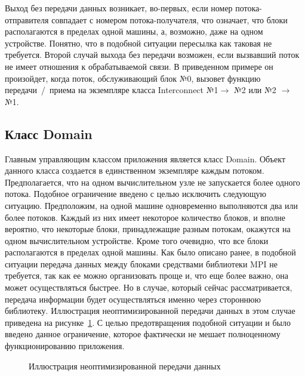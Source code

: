 \documentclass[a4paper, 14pt]{extarticle}
\theoremstyle{definition}
\begin{document}
\par Выход без передачи данных возникает, во-первых, если номер потока-отправителя совпадает с номером потока-получателя, что означает, что блоки располагаются в пределах одной машины, а, возможно, даже на одном устройстве. Понятно, что в подобной ситуации пересылка как таковая не требуется. Второй случай выхода без передачи возможен, если вызвавший поток не имеет отношения к обрабатываемой связи. В приведенном примере он произойдет, когда поток, обслуживающий блок №0, вызовет функцию передачи~/~приема на экземпляре класса Interconnect {№1$\to$ №2} или {№2 $\to$ №1}.



\subsection{Класс Domain}

\par Главным управляющим классом приложения является класс Domain. Объект данного класса создается в единственном экземпляре каждым потоком. Предполагается, что на одном вычислительном узле не запускается более одного потока. Подобное ограничение введено с целью исключить следующую ситуацию. Предположим, на одной машине одновременно выполняются два или более потоков. Каждый из них имеет некоторое количество блоков, и вполне вероятно, что некоторые блоки, принадлежащие разным потокам, окажутся на одном вычислительном устройстве. Кроме того очевидно, что все блоки располагаются в пределах одной машины. Как было описано ранее, в подобной ситуации передача данных между блоками средствами библиотеки MPI не требуется, так как ее можно организовать проще и, что еще более важно, она может осуществляться быстрее. Но в случае, который сейчас рассматривается, передача информации будет осуществляться именно через стороннюю библиотеку. Иллюстрация неоптимизированной передачи данных в этом случае приведена на рисунке~\ref{ris:error_ex}. С целью предотвращения подобной ситуации и было введено данное ограничение, которое фактически не мешает полноценному функционированию приложения.
\begin{figure}[h]
	\caption{Иллюстрация неоптимизированной передачи данных}
	\label{ris:error_ex}
\end{figure}
\end{document}
